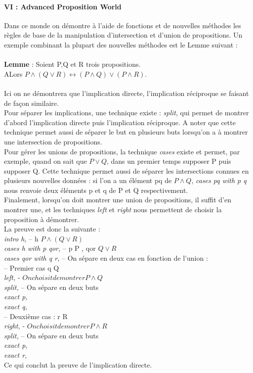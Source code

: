 \documentclass[french,frenchkw]{article}
\begin{document}
\paragraph{VI : Advanced Proposition World}
Dans ce monde on démontre à l'aide de fonctions et de nouvelles méthodes les règles de base de la manipulation d'intersection et d'union de propositions. Un exemple combinant la plupart des nouvelles méthodes est le Lemme suivant : \\
\\
\textbf{Lemme} : Soient P,Q et R trois propositions. \\
ALors $P\land(Q\lor R) \longleftrightarrow (P\land Q)\lor(P\land R)$.\\
\\
Ici on ne démontrera que l'implication directe, l'implication réciproque se faisant de façon similaire.\\
Pour séparer les implications, une technique existe : \textit{split}, qui permet de montrer d'abord l'implication directe puis l'implication réciproque. A noter que cette technique permet aussi de séparer le but en plusieurs buts lorsqu'on a à montrer une intersection de propositions.\\
Pour gérer les unions de propositions, la technique \textit{cases} existe et permet, par exemple, quand on sait que $P\lor Q$, dans un premier temps supposer P puis supposer Q. Cette technique permet aussi de séparer les intersections connues en plusieurs nouvelles données : si l'on a un élément pq de $P\land Q$, \textit{cases pq with p q} nous renvoie deux éléments p et q de P et Q respectivement.\\
Finalement, lorsqu'on doit montrer une union de propositions, il suffit d'en montrer une, et les techniques \textit{left} et \textit{right} nous permettent de choisir la proposition à démontrer.\\
La preuve est donc la suivante : \\

\textit{intro h,}     -- h \in $P\land (Q\lor R)$\\ 
\textit{cases h with p qor,}     -- p \in P , qor \in $Q\lor R$\\
\textit{cases qor with q r,}     -- On sépare en deux cas en fonction de l'union :\\ 

-- Premier cas q \in Q\\
\textit{left,}   - $On choisit de montrer P\land Q$\\
\textit{split,}     -- On sépare en deux buts\\
\textit{exact p,}\\
\textit{exact q,}\\

-- Deuxième cas : r \in R\\
\textit{right,}     - $On choisit de montrer P\land R$\\
\textit{split,}     -- On sépare en deux buts\\
\textit{exact p,}\\
\textit{exact r,}\\
Ce qui conclut la preuve de l'implication directe.


\end{document}
